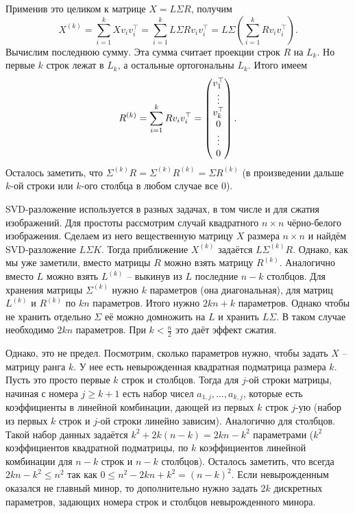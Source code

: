 Применив это целиком к матрице $X=L\Sigma R$, получим 
$$X^{(k)}=\sum_{i=1}^k Xv_iv_i^{\top}=\sum_{i=1}^k L\Sigma Rv_iv_i^{\top}=L\Sigma \left(\sum_{i=1}^k Rv_iv_i^{\top}\right).$$
Вычислим последнюю сумму. Эта сумма считает проекции строк $R$ на $L_k$. Но первые $k$ строк лежат в $L_k$, а остальные ортогональны $L_k$. Итого имеем
$$R^{(k)}=\sum_{i=1}^k Rv_iv_i^{\top} = \begin{pmatrix} v_1^{\top} \\ \vdots \\ v_k^{\top} \\ 0 \\ \vdots \\ 0 \end{pmatrix}.$$
Осталось заметить, что $\Sigma^{(k)} R= \Sigma^{(k)}R^{(k)}=\Sigma R^{(k)}$ (в произведении дальше $k$-ой строки или $k$-ого столбца в любом случае все 0).
\endproof
\ethrm 

SVD-разложение используется в разных задачах, в том числе и для сжатия изображений.  Для простоты рассмотрим случай квадратного $n \times n$ чёрно-белого изображения. Сделаем из него вещественную матрицу $X$ размера $n \times n$ и найдём SVD-разложение $L \Sigma K$. Тогда приближение $X^{(k)}$ задаётся $L\Sigma^{(k)}R$. Однако, как мы уже заметили, вместо матрицы $R$ можно взять матрицу $R^{(k)}$. Аналогично вместо $L$ можно взять $L^{(k)}$ -- выкинув из $L$ последние $n-k$ столбцов. Для хранения матрицы $\Sigma^{(k)}$ нужно $k$ параметров (она диагональная), для матриц $L^{(k)}$ и $R^{(k)}$ по $kn$ параметров. Итого нужно $2kn+k$ параметров. Однако чтобы не хранить отдельно $\Sigma$ её можно домножить на $L$ и хранить $L\Sigma$. В таком случае необходимо $2kn$ параметров. При $k<\frac{n}{2}$ это даёт эффект сжатия. 

Однако, это не предел. Посмотрим, сколько параметров нужно, чтобы задать $X$ -- матрицу ранга $k$. У нее есть невырожденная квадратная подматрица размера $k$. Пусть это просто первые $k$ строк и столбцов. Тогда для $j$-ой строки матрицы, начиная с номера $j \geq k+1$ есть набор чисел $a_{1,j},\dots,a_{k,j}$, которые есть коэффициенты в линейной комбинации, дающей из первых $k$ строк $j$-ую (набор из первых $k$ строк и $j$-ой строки линейно зависим). Аналогично для столбцов. Такой набор данных задаётся $k^2+ 2k(n-k)=2kn-k^2$ параметрами ($k^2$ коэффициентов квадратной подматрицы, по $k$ коэффициентов линейной комбинации для $n - k$ строк и $n - k$ столбцов). Осталось заметить, что всегда $2kn - k^2\leq n^2$ так как $0\leq n^2-2kn+k^2=(n-k)^2$. Если невырожденным оказался не главный минор, то дополнительно нужно задать $2k$ дискретных параметров, задающих номера строк и столбцов невырожденного минора.